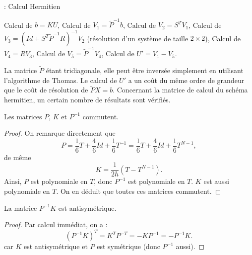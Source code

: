 \begin{center}
\begin{minipage}[H]{12cm}
  \begin{algorithm}[H]
    \caption{: Calcul Hermitien}\label{alg:SH}
    \begin{algorithmic}[1]
    \State Calcul de $b = K U$,
	\State Calcul de $V_1 = \tilde{P}^{-1} b$,
	\State Calcul de $V_2 = S^T V_1$,
	\State Calcul de $V_3 = (Id + S^T \tilde{P}^{-1}R)^{-1} V_2$ (résolution d'un système de taille $2 \times 2$),
	\State Calcul de $V_4 = R V_3$,
	\State Calcul de $V_5 = \tilde{P}^{-1} V_4$,
	\State Calcul de $U' = V_1 - V_5$.
    \end{algorithmic}
    \end{algorithm}
\end{minipage}
\end{center}
La matrice $\tilde{P}$ étant tridiagonale, elle peut être inversée simplement en utilisant l'algorithme de Thomas. Le calcul de $U'$ a un coût du même ordre de grandeur que le coût de résolution de $\tilde{P}X = b$. Concernant la matrice de calcul du schéma hermitien, un certain nombre de résultats sont vérifiés.

\begin{proposition}
Les matrices $P$, $K$ et $P^{-1}$ commutent.
\end{proposition}

\begin{proof}
On remarque directement que 
\begin{equation}
P = \dfrac{1}{6} T + \dfrac{4}{6} Id + \dfrac{1}{6} T^{-1} = \dfrac{1}{6} T + \dfrac{4}{6} Id + \dfrac{1}{6} T^{N-1},
\end{equation}
de même
\begin{equation}
K = \dfrac{1}{2h} \left( T - T^{N-1} \right).
\end{equation}
Ainsi, $P$ est polynomiale en $T$, donc $P^{-1}$ est polynomiale en $T$. $K$ est aussi polynomiale en $T$.
On en déduit que toutes ces matrices commutent.
\end{proof}

\begin{proposition}
La matrice $P^{-1}K$ est antisymétrique.
\end{proposition}

\begin{proof}
Par calcul immédiat, on a :
\begin{equation}
(P^{-1}K)^T = K^T P^{-T} = - K P^{-1} = - P^{-1} K.
\end{equation}
car $K$ est antisymétrique et $P$ est symétrique (donc $P^{-1}$ aussi). 
\end{proof}






















